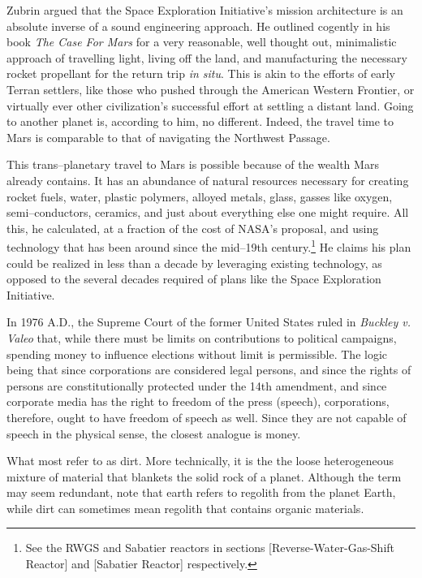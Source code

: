 Zubrin argued that the Space Exploration Initiative's mission architecture is an absolute inverse of a sound engineering approach. He outlined cogently in his book {\it The Case For Mars} for a very reasonable, well thought out, minimalistic approach of travelling light, living off the land, and manufacturing the necessary rocket propellant for the return trip {\it in situ}. This is akin to the efforts of early Terran settlers, like those who pushed through the American Western Frontier, or virtually ever other civilization's successful effort at settling a distant land. Going to another planet is, according to him, no different. Indeed, the travel time to Mars is comparable to that of navigating the Northwest Passage.

This trans--planetary travel to Mars is possible because of the wealth Mars already contains. It has an abundance of natural resources necessary for creating rocket fuels, water, plastic polymers, alloyed metals, glass, gasses like oxygen, semi--conductors, ceramics, and just about everything else one might require. All this, he calculated, at a fraction of the cost of NASA's proposal, and using technology that has been around since the mid--19th century.\footnote{See the RWGS and Sabatier reactors in sections \in{}[Reverse-Water-Gas-Shift Reactor] and \in{}[Sabatier Reactor] respectively.} He claims his plan could be realized in less than a decade by leveraging existing technology, as opposed to the several decades required of plans like the Space Exploration Initiative.

In 1976 A.D., the Supreme Court of the former United States ruled in {\it Buckley v. Valeo} that, while there must be limits on contributions to political campaigns, spending money to influence elections without limit is permissible. The logic being that since corporations are considered legal persons, and since the rights of persons are constitutionally protected under the 14th amendment, and since corporate media has the right to freedom of the press (speech), corporations, therefore, ought to have freedom of speech as well. Since they are not capable of speech in the physical sense, the closest analogue is money.

What most refer to as dirt. More technically, it is the the loose heterogeneous mixture of material that blankets the solid rock of a planet. Although the term may seem redundant, note that earth refers to regolith from the planet Earth, while dirt can sometimes mean regolith that contains organic materials.

